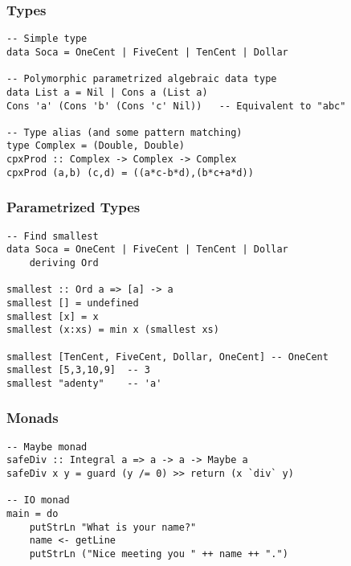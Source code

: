 \documentclass{beamer}
\begin{document}
\begin{frame}[fragile]
\frametitle{Types}
\begin{verbatim}
-- Simple type
data Soca = OneCent | FiveCent | TenCent | Dollar

-- Polymorphic parametrized algebraic data type
data List a = Nil | Cons a (List a)
Cons 'a' (Cons 'b' (Cons 'c' Nil))   -- Equivalent to "abc"

-- Type alias (and some pattern matching)
type Complex = (Double, Double)
cpxProd :: Complex -> Complex -> Complex
cpxProd (a,b) (c,d) = ((a*c-b*d),(b*c+a*d))
\end{verbatim}
\end{frame}


\begin{frame}[fragile]
\frametitle{Parametrized Types}
\begin{verbatim}
-- Find smallest
data Soca = OneCent | FiveCent | TenCent | Dollar
    deriving Ord

smallest :: Ord a => [a] -> a
smallest [] = undefined
smallest [x] = x
smallest (x:xs) = min x (smallest xs)

smallest [TenCent, FiveCent, Dollar, OneCent] -- OneCent
smallest [5,3,10,9]  -- 3
smallest "adenty"    -- 'a'
\end{verbatim}
\end{frame}


\begin{frame}[fragile]
\frametitle{Monads}
\begin{verbatim}
-- Maybe monad
safeDiv :: Integral a => a -> a -> Maybe a
safeDiv x y = guard (y /= 0) >> return (x `div` y)

-- IO monad
main = do
    putStrLn "What is your name?"
    name <- getLine
    putStrLn ("Nice meeting you " ++ name ++ ".")
\end{verbatim}
\end{frame}
\end{document}
